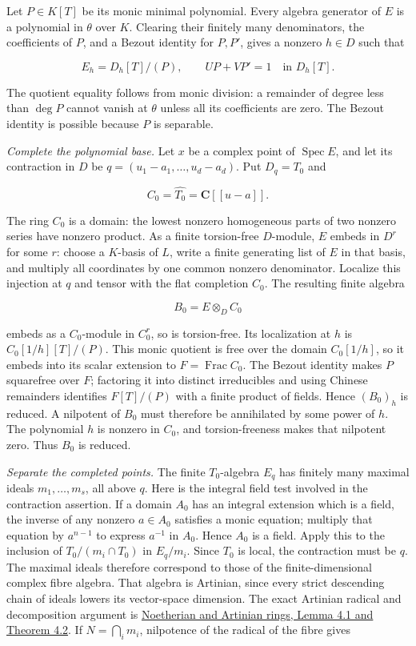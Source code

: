\documentclass[11pt]{article}
\begin{document}
Let \(P\in K[T]\) be its monic minimal polynomial. Every algebra
generator of \(E\) is a polynomial in \(\theta\) over \(K\). Clearing
their finitely many denominators, the coefficients of \(P\), and a
Bezout identity for \(P,P'\), gives a nonzero \(h\in D\) such that

\[
E_h=D_h[T]/(P),\qquad
U P+V P'=1\quad\text{in }D_h[T].
\]

The quotient equality follows from monic division: a remainder of degree
less than \(\deg P\) cannot vanish at \(\theta\) unless all its
coefficients are zero. The Bezout identity is possible because \(P\) is
separable.

\emph{Complete the polynomial base.} Let \(x\) be a complex point of
\(\operatorname{Spec}E\), and let its contraction in \(D\) be
\(q=(u_1-a_1,\ldots,u_d-a_d)\). Put \(D_q=T_0\) and

\[
C_0=\widehat{T_0}=\mathbf C[[u-a]].
\]

The ring \(C_0\) is a domain: the lowest nonzero homogeneous parts of
two nonzero series have nonzero product. As a finite torsion-free
\(D\)-module, \(E\) embeds in \(D^r\) for some \(r\): choose a
\(K\)-basis of \(L\), write a finite generating list of \(E\) in that
basis, and multiply all coordinates by one common nonzero denominator.
Localize this injection at \(q\) and tensor with the flat completion
\(C_0\). The resulting finite algebra

\[
B_0=E\otimes_D C_0
\]

embeds as a \(C_0\)-module in \(C_0^r\), so is torsion-free. Its
localization at \(h\) is \(C_0[1/h][T]/(P)\). This monic quotient is
free over the domain \(C_0[1/h]\), so it embeds into its scalar
extension to \(F=\operatorname{Frac}C_0\). The Bezout identity makes
\(P\) squarefree over \(F\); factoring it into distinct irreducibles and
using Chinese remainders identifies \(F[T]/(P)\) with a finite product
of fields. Hence \((B_0)_h\) is reduced. A nilpotent of \(B_0\) must
therefore be annihilated by some power of \(h\). The polynomial \(h\) is
nonzero in \(C_0\), and torsion-freeness makes that nilpotent zero. Thus
\(B_0\) is reduced.

\emph{Separate the completed points.} The finite \(T_0\)-algebra \(E_q\)
has finitely many maximal ideals \(m_1,\ldots,m_s\), all above \(q\).
Here is the integral field test involved in the contraction assertion.
If a domain \(A_0\) has an integral extension which is a field, the
inverse of any nonzero \(a\in A_0\) satisfies a monic equation; multiply
that equation by \(a^{n-1}\) to express \(a^{-1}\) in \(A_0\). Hence
\(A_0\) is a field. Apply this to the inclusion of \(T_0/(m_i\cap T_0)\)
in \(E_q/m_i\). Since \(T_0\) is local, the contraction must be \(q\).
The maximal ideals therefore correspond to those of the
finite-dimensional complex fibre algebra. That algebra is Artinian,
since every strict descending chain of ideals lowers its vector-space
dimension. The exact Artinian radical and decomposition argument is
\href{../../AG-CA/AG-CA-03.html\#4-what-an-artinian-ring-looks-like}{Noetherian
and Artinian rings, Lemma 4.1 and Theorem 4.2}. If \(N=\bigcap_i m_i\),
nilpotence of the radical of the fibre gives
\end{document}
